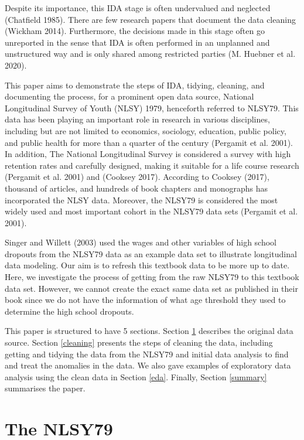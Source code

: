 \documentclass{article}
\begin{document}
Despite its importance, this IDA stage is often undervalued and neglected (Chatfield 1985). There are few research papers that document the data cleaning (Wickham 2014). Furthermore, the decisions made in this stage often go unreported in the sense that IDA is often performed in an unplanned and unstructured way and is only shared among restricted parties (M. Huebner et al. 2020).

This paper aims to demonstrate the steps of IDA, tidying, cleaning, and documenting the process, for a prominent open data source, National Longitudinal Survey of Youth (NLSY) 1979, henceforth referred to NLSY79. This data has been playing an important role in research in various disciplines, including but are not limited to economics, sociology, education, public policy, and public health for more than a quarter of the century (Pergamit et al. 2001). In addition, The National Longitudinal Survey is considered a survey with high retention rates and carefully designed, making it suitable for a life course research (Pergamit et al. 2001) and (Cooksey 2017). According to Cooksey (2017), thousand of articles, and hundreds of book chapters and monographs has incorporated the NLSY data. Moreover, the NLSY79 is considered the most widely used and most important cohort in the NLSY79 data sets (Pergamit et al. 2001).

Singer and Willett (2003) used the wages and other variables of high school dropouts from the NLSY79 data as an example data set to illustrate longitudinal data modeling. Our aim is to refresh this textbook data to be more up to date. Here, we investigate the process of getting from the raw NLSY79 to this textbook data set. However, we cannot create the exact same data set as published in their book since we do not have the information of what age threshold they used to determine the high school dropouts.

This paper is structured to have 5 sections. Section \ref{database} describes the original data source. Section \ref{cleaning} presents the steps of cleaning the data, including getting and tidying the data from the NLSY79 and initial data analysis to find and treat the anomalies in the data. We also gave examples of exploratory data analysis using the clean data in Section \ref{eda}. Finally, Section \ref{summary} summarises the paper.

\hypertarget{database}{%
\section{The NLSY79}\label{database}}
\end{document}
